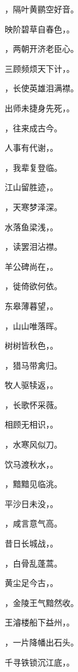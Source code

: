 \documentclass[12pt, a4paper, addpoints, answers]{exam}
\begin{document}
\begin{questions}
\question[3] \fillin ，隔叶黄鹂空好音。

\question[3] 映阶碧草自春色，\fillin 。

\question[3] \fillin ，两朝开济老臣心。

\question[3] 三顾频烦天下计，\fillin 。

\question[3] \fillin ，长使英雄泪满襟。

\question[3] 出师未捷身先死，\fillin 。

\question[3] \fillin ，往来成古今。

\question[3] 人事有代谢，\fillin 。

\question[3] \fillin ，我辈复登临。

\question[3] 江山留胜迹，\fillin 。

\question[3] \fillin ，天寒梦泽深。

\question[3] 水落鱼梁浅，\fillin 。

\question[3] \fillin ，读罢泪沾襟。

\question[3] 羊公碑尚在，\fillin 。

\question[3] \fillin ，徙倚欲何依。

\question[3] 东皋薄暮望，\fillin 。

\question[3] \fillin ，山山唯落晖。

\question[3] 树树皆秋色，\fillin 。

\question[3] \fillin ，猎马带禽归。

\question[3] 牧人驱犊返，\fillin 。

\question[3] \fillin ，长歌怀采薇。

\question[3] 相顾无相识，\fillin 。

\question[3] \fillin ，水寒风似刀。

\question[3] 饮马渡秋水，\fillin 。

\question[3] \fillin ，黯黯见临洮。

\question[3] 平沙日未没，\fillin 。

\question[3] \fillin ，咸言意气高。

\question[3] 昔日长城战，\fillin 。

\question[3] \fillin ，白骨乱蓬蒿。

\question[3] 黄尘足今古，\fillin 。

\question[3] \fillin ，金陵王气黯然收。

\question[3] 王濬楼船下益州，\fillin 。

\question[3] \fillin ，一片降幡出石头。

\question[3] 千寻铁锁沉江底，\fillin 。


\end{questions}
\end{document}
